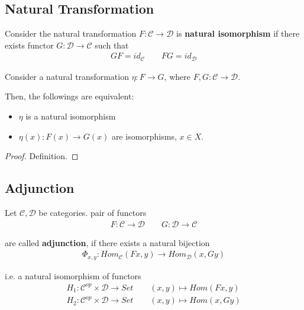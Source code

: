 \documentclass[Total.tex]{subfiles}
\begin{document}
				\subsection{Natural Transformation}
			\begin{Def}
				Consider the natural transformation $F:\mathcal{C}\rightarrow \mathcal{D}$ is \textbf{natural isomorphism} if there exists functor $G:\mathcal{D}\rightarrow \mathcal{C}$ such that
				\begin{gather*}
					GF=id_\mathcal{C}\qquad FG=id_\mathcal{D}
				\end{gather*}
			\end{Def}
			
			\begin{lemma}
				Consider a natural transformation $\eta:F\rightarrow G$, where $F,G:\mathcal{C}\rightarrow \mathcal{D}$. 
				
				Then, the followings are equivalent:
				\begin{itemize}
					\item $\eta$ is a natural isomorphism
					\item $\eta(x):F(x)\rightarrow G(x)$ are isomorphisms, $x\in X$. 
					
				\end{itemize}
			\end{lemma}
			\begin{proof}
				Definition. 
			\end{proof}
			\subsection{Adjunction}
			\begin{Def}
				Let $\mathcal{C},\mathcal{D}$ be categories. pair of functors 
				\begin{gather*}
					F:\mathcal{C}\rightarrow \mathcal{D}\qquad G:\mathcal{D}\rightarrow \mathcal{C}
				\end{gather*}
				
				are called \textbf{adjunction}, if there exists a natural bijection
				\begin{gather*}
					\Phi_{x,y}:Hom_\mathcal{C}(Fx,y)\stackrel{}{\rightarrow} Hom_\mathcal{D}(x,Gy) 
				\end{gather*}
				
				i.e. a natural isomorphism of functors
				\begin{gather*}
					H_1:\mathcal{C}^{op}\times \mathcal{D}\rightarrow Set\qquad (x,y)\mapsto Hom(Fx,y)\\
					H_2:\mathcal{C}^{op}\times \mathcal{D}\rightarrow Set\qquad (x,y)\mapsto Hom(x,Gy)
				\end{gather*}
				
				\begin{center}
				\end{center}
			\end{Def}
			
\end{document}

